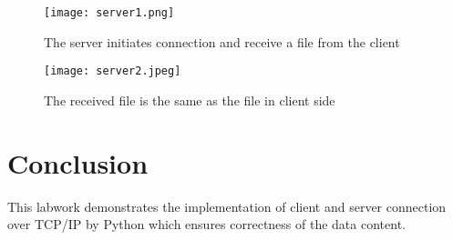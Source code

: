 \documentclass{article}
\begin{document}
\begin{figure}[h!]
    \centering
    \texttt{[image: server1.png]}
    \caption{The server initiates connection and receive a file from the client}
    \label{fig:client}
\end{figure}

\begin{figure}[h!]
    \centering
    \texttt{[image: server2.jpeg]}
    \caption{The received file is the same as the file in client side}
    \label{fig:client}
\end{figure}



\section{Conclusion}
This labwork demonstrates the implementation of client and server connection over TCP/IP by Python which ensures correctness of the data content.
\end{document}
